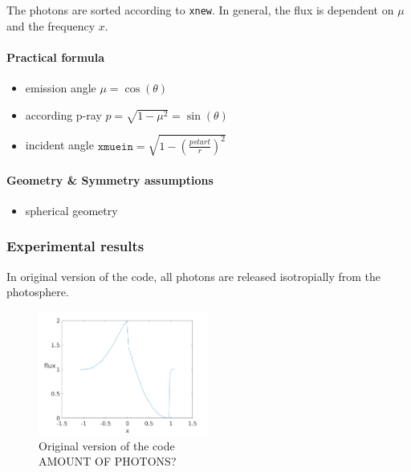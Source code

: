 \documentclass[../main/main.tex]{subfiles}
\begin{document}
\newpage
\begin{center}
\end{center}
The photons are sorted according to \texttt{xnew}.
In general, the flux is dependent on $\mu$ and the frequency $x$.


\paragraph{Practical formula}
\begin{itemize}
\item emission angle $\mu = \cos(\theta)$
\item according p-ray $p = \sqrt{1-\mu^2} = \sin(\theta)$
\item incident angle $\texttt{xmuein} = \sqrt{1-\left(\frac{pstart}{r}\right)^2}$
\end{itemize}

\paragraph{Geometry \& Symmetry assumptions}
\begin{itemize}
\item spherical geometry
\end{itemize}

\subsubsection{Experimental results}
In original version of the code, all photons are released isotropially from the photosphere.

\begin{figure}[!htp]
\centering
\includegraphics[width=0.5\textwidth]{../../introductory_exercises/P_Cygni_profile_UV_resonance/data/npot6xk0100alpha0beta1test0.png}
\caption{Original version of the code \\ AMOUNT OF PHOTONS?}
\end{figure}
\end{document}
